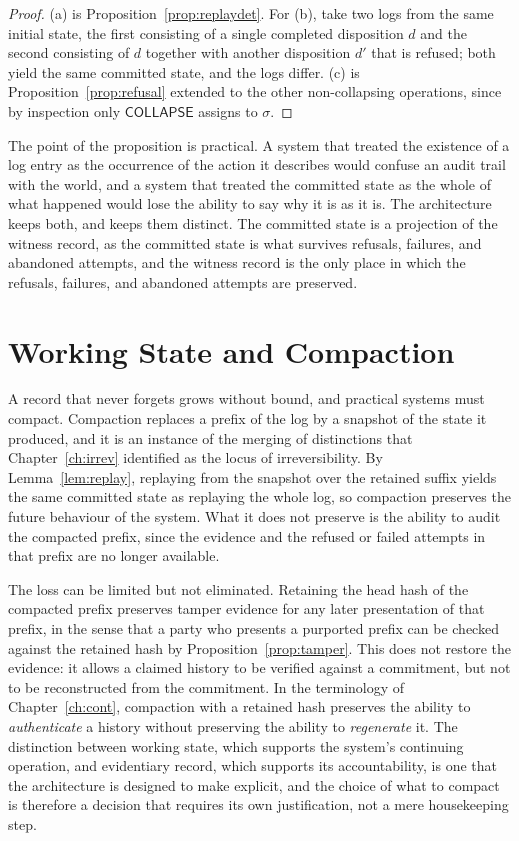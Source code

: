 \documentclass[11pt,twoside,openright]{book}
\theoremstyle{plain}
\theoremstyle{definition}
\theoremstyle{remark}
\newcommand{\collapse}{\mathsf{COLLAPSE}}
\begin{document}
\begin{proof}
(a) is Proposition~\ref{prop:replaydet}. For (b), take two logs from the same initial state, the first consisting of a single completed disposition $d$ and the second consisting of $d$ together with another disposition $d'$ that is refused; both yield the same committed state, and the logs differ. (c) is Proposition~\ref{prop:refusal} extended to the other non-collapsing operations, since by inspection only $\collapse$ assigns to $\sigma$.
\end{proof}

The point of the proposition is practical. A system that treated the existence of a log entry as the occurrence of the action it describes would confuse an audit trail with the world, and a system that treated the committed state as the whole of what happened would lose the ability to say why it is as it is. The architecture keeps both, and keeps them distinct. The committed state is a projection of the witness record, as the committed state is what survives refusals, failures, and abandoned attempts, and the witness record is the only place in which the refusals, failures, and abandoned attempts are preserved.

\section{Working State and Compaction}

A record that never forgets grows without bound, and practical systems must compact. Compaction replaces a prefix of the log by a snapshot of the state it produced, and it is an instance of the merging of distinctions that Chapter~\ref{ch:irrev} identified as the locus of irreversibility. By Lemma~\ref{lem:replay}, replaying from the snapshot over the retained suffix yields the same committed state as replaying the whole log, so compaction preserves the future behaviour of the system. What it does not preserve is the ability to audit the compacted prefix, since the evidence and the refused or failed attempts in that prefix are no longer available.

The loss can be limited but not eliminated. Retaining the head hash of the compacted prefix preserves tamper evidence for any later presentation of that prefix, in the sense that a party who presents a purported prefix can be checked against the retained hash by Proposition~\ref{prop:tamper}. This does not restore the evidence: it allows a claimed history to be verified against a commitment, but not to be reconstructed from the commitment. In the terminology of Chapter~\ref{ch:cont}, compaction with a retained hash preserves the ability to \emph{authenticate} a history without preserving the ability to \emph{regenerate} it. The distinction between working state, which supports the system's continuing operation, and evidentiary record, which supports its accountability, is one that the architecture is designed to make explicit, and the choice of what to compact is therefore a decision that requires its own justification, not a mere housekeeping step.
\end{document}
